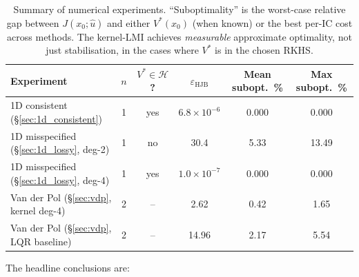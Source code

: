 \documentclass[11pt]{article}
\begin{document}
\begin{table}[h]
\centering
\caption{Summary of numerical experiments. ``Suboptimality'' is the worst-case relative gap between $J(x_0;\hat u)$ and either $V^*(x_0)$ (when known) or the best per-IC cost across methods. The kernel-LMI achieves \emph{measurable} approximate optimality, not just stabilisation, in the cases where $V^*$ is in the chosen RKHS.}
\label{tab:comparison_all}
\begin{tabular}{lccccc}
\toprule
Experiment & $n$ & $V^*\in\mathcal H$? & $\varepsilon_{\mathrm{HJB}}$ & Mean subopt.\ \% & Max subopt.\ \% \\
\midrule
1D consistent (\S\ref{sec:1d_consistent})         & 1 & yes & $6.8\times 10^{-6}$ & 0.000 & 0.000 \\
1D misspecified (\S\ref{sec:1d_lossy}, deg-2)     & 1 & no  & 30.4               & 5.33  & 13.49 \\
1D misspecified (\S\ref{sec:1d_lossy}, deg-4)     & 1 & yes & $1.0\times 10^{-7}$ & 0.000 & 0.000 \\
Van der Pol (\S\ref{sec:vdp}, kernel deg-4)       & 2 & --  & 2.62               & 0.42  & 1.65 \\
Van der Pol (\S\ref{sec:vdp}, LQR baseline)       & 2 & --  & 14.96              & 2.17  & 5.54 \\
\bottomrule
\end{tabular}
\end{table}

The headline conclusions are:
\end{document}
